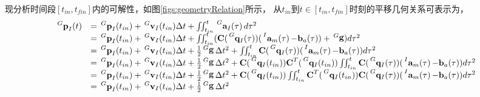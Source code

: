 \documentclass{article}
\begin{document}
\par
现分析时间段$\left[t_{in},t_{fin}\right]$内的可解性，如图\ref{figs:geometryRelation}所示，
从$t_{in}$到$t\in\left[t_{in},t_{fin}\right]$时刻的平移几何关系可表示为，
\begin{equation}
    \begin{array}{ll}
        \sideset{^G}{}{\mathop{\textbf{p}_{I}}}(t)&=\sideset{^G}{}{\mathop{\textbf{p}_{I}}}(t_{in})+
        \sideset{^G}{}{\mathop{\textbf{v}_{I}}}(t_{in})\Delta{t}+\iint_{t_{in}}^{t}\sideset{^G}{}{\mathop{\mathbf{a}_{I}(\tau)}}d{\tau}^2\\
        &=\sideset{^G}{}{\mathop{\textbf{p}_{I}}}(t_{in})+
        \sideset{^G}{}{\mathop{\textbf{v}_{I}}}(t_{in})\Delta{t}+\iint_{t_{in}}^{t}
        (\textbf{C}(\sideset{^G}{}{\mathop{\mathbf{q}_{I}(\tau)}})(
        \sideset{^I}{}{\mathop{\mathbf{a}_{m}(\tau)}}-\textbf{b}_{a}(\tau))
        +\sideset{^G}{}{\mathop{\mathbf{g}}})d{\tau}^2\\
        &=\sideset{^G}{}{\mathop{\textbf{p}_{I}}}(t_{in})+
        \sideset{^G}{}{\mathop{\textbf{v}_{I}}}(t_{in})\Delta{t}
        +\frac{1}{2}\sideset{^G}{}{\mathop{\mathbf{g}}}\Delta{t}^{2}
        +\iint_{t_{in}}^{t}\textbf{C}(\sideset{^G}{}{\mathop{\mathbf{q}_{I}(\tau)}})
        (\sideset{^I}{}{\mathop{\mathbf{a}_{m}(\tau)}}-\textbf{b}_{a}(\tau))d{\tau}^2\\
        &=\sideset{^G}{}{\mathop{\textbf{p}_{I}}}(t_{in})+
        \sideset{^G}{}{\mathop{\textbf{v}_{I}}}(t_{in})\Delta{t}
        +\frac{1}{2}\sideset{^G}{}{\mathop{\mathbf{g}}}\Delta{t}^{2}
        +\textbf{C}(\sideset{^G}{}{\mathop{\mathbf{q}_{I}(t_{in})}})\textbf{C}^T(\sideset{^G}{}{\mathop{\mathbf{q}_{I}(t_{in})}})
        \iint_{t_{in}}^{t}\textbf{C}(\sideset{^G}{}{\mathop{\mathbf{q}_{I}(\tau)}})
        (\sideset{^I}{}{\mathop{\mathbf{a}_{m}(\tau)}}-\textbf{b}_{a}(\tau))d{\tau}^2\\
        &=\sideset{^G}{}{\mathop{\textbf{p}_{I}}}(t_{in})+
        \sideset{^G}{}{\mathop{\textbf{v}_{I}}}(t_{in})\Delta{t}
        +\frac{1}{2}\sideset{^G}{}{\mathop{\mathbf{g}}}\Delta{t}^{2}
        +\textbf{C}(\sideset{^G}{}{\mathop{\mathbf{q}_{I}(t_{in})}})
        \iint_{t_{in}}^{t}\textbf{C}^T(\sideset{^G}{}{\mathop{\mathbf{q}_{I}(t_{in})}})\textbf{C}(\sideset{^G}{}{\mathop{\mathbf{q}_{I}(\tau)}})
        (\sideset{^I}{}{\mathop{\mathbf{a}_{m}(\tau)}}-\textbf{b}_{a}(\tau))d{\tau}^2\\
        &=\sideset{^G}{}{\mathop{\textbf{p}_{I}}}(t_{in})+
        \sideset{^G}{}{\mathop{\textbf{v}_{I}}}(t_{in})\Delta{t}
        +\frac{1}{2}\sideset{^G}{}{\mathop{\mathbf{g}}}\Delta{t}^{2}

\end{array}
\end{equation}
\end{document}
